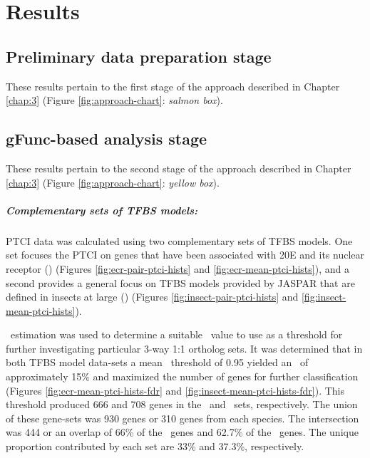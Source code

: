 

\chapter{Results} \label{chap:4}

\section{Preliminary data preparation stage}

These results pertain to the first stage of the approach described in Chapter \ref{chap:3} (Figure \ref{fig:approach-chart}: \textit{salmon box}).

\section{gFunc-based analysis stage}




These results pertain to the second stage of the approach described in Chapter \ref{chap:3} (Figure \ref{fig:approach-chart}: \textit{yellow box}).

\paragraph*{Complementary sets of TFBS models:}
\gls{PTCI} data was calculated using two complementary sets of \gls{TFBS} models.
%
One set focuses the \gls{PTCI} on genes that have been associated with \gls{20E} and its nuclear receptor (\PTCIe) (Figures \ref{fig:ecr-pair-ptci-hists} and \ref{fig:ecr-mean-ptci-hists}), and a second provides a general focus on \gls{TFBS} models provided by JASPAR that are defined in insects at large (\PTCIi) (Figures \ref{fig:insect-pair-ptci-hists} and \ref{fig:insect-mean-ptci-hists}).
%




%
\FDR\ estimation was used to determine a suitable \PTCI\ value to use as a threshold for further investigating particular 3-way 1:1 ortholog sets.
%
It was determined that in both \gls{TFBS} model data-sets a mean \PTCI\ threshold of 0.95 yielded an \FDR\ of approximately 15\% and maximized the number of genes for further classification (Figures \ref{fig:ecr-mean-ptci-hists-fdr} and \ref{fig:insect-mean-ptci-hists-fdr}).
%
This threshold produced 666 and 708 genes in the \PTCIi\ and \PTCIe\ sets, respectively.
%
The union of these gene-sets was 930 genes or 310 genes from each species.
%
The intersection was 444 or an overlap of 66\% of the \PTCIi\ genes and 62.7\% of the \PTCIe\ genes.
%
The unique proportion contributed by each set are 33\% and 37.3\%, respectively.

